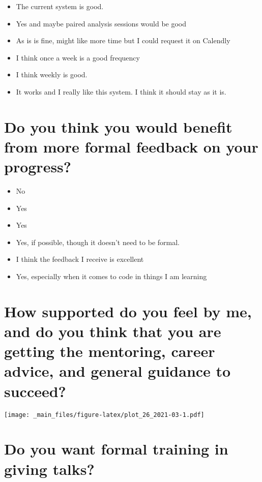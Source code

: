 \documentclass[
]{book}
\providecommand{\tightlist}{%
  \setlength{\itemsep}{0pt}\setlength{\parskip}{0pt}}
\begin{document}
\begin{itemize}
\tightlist
\item
  The current system is good.
\item
  Yes and maybe paired analysis sessions would be good
\item
  As is is fine, might like more time but I could request it on Calendly
\item
  I think once a week is a good frequency
\item
  I think weekly is good.
\item
  It works and I really like this system. I think it should stay as it is.
\end{itemize}

\hypertarget{do-you-think-you-would-benefit-from-more-formal-feedback-on-your-progress-1}{%
\section{Do you think you would benefit from more formal feedback on your progress?}\label{do-you-think-you-would-benefit-from-more-formal-feedback-on-your-progress-1}}

\begin{itemize}
\tightlist
\item
  No
\item
  Yes
\item
  Yes
\item
  Yes, if possible, though it doesn't need to be formal.
\item
  I think the feedback I receive is excellent
\item
  Yes, especially when it comes to code in things I am learning
\end{itemize}

\hypertarget{how-supported-do-you-feel-by-me-and-do-you-think-that-you-are-getting-the-mentoring-career-advice-and-general-guidance-to-succeed-1}{%
\section{How supported do you feel by me, and do you think that you are getting the mentoring, career advice, and general guidance to succeed?}\label{how-supported-do-you-feel-by-me-and-do-you-think-that-you-are-getting-the-mentoring-career-advice-and-general-guidance-to-succeed-1}}

\texttt{[image: \_main\_files/figure-latex/plot\_26\_2021-03-1.pdf]}

\hypertarget{do-you-want-formal-training-in-giving-talks-1}{%
\section{Do you want formal training in giving talks?}\label{do-you-want-formal-training-in-giving-talks-1}}
\end{document}
